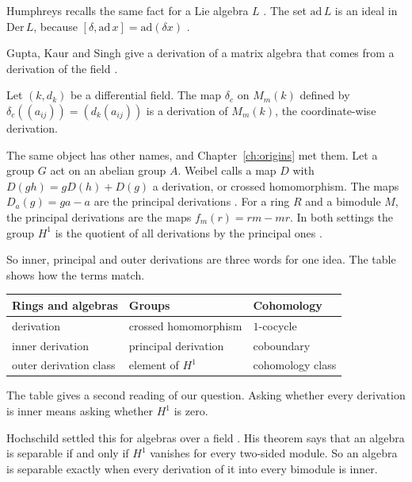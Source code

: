Humphreys recalls the same fact for a Lie algebra $L$
\cite[\S5.3, p.~23]{Humphreys1972}. The set $\mathrm{ad}\,L$ is an ideal in
$\mathrm{Der}\,L$, because $[\delta,\mathrm{ad}\,x]=\mathrm{ad}(\delta x)$
\cite[\S5.3, p.~23]{Humphreys1972}.

Gupta, Kaur and Singh give a derivation of a matrix algebra that comes from a
derivation of the field \cite[Example~1.4]{GuptaKaurSingh2023}.

\begin{example}\label{ex:basic:matrices}
Let $(k,d_k)$ be a differential field. The map $\delta_c$ on $M_m(k)$ defined by
$\delta_c((a_{ij}))=(d_k(a_{ij}))$ is a derivation of $M_m(k)$, the
coordinate-wise derivation.
\end{example}

The same object has other names, and Chapter~\ref{ch:origins} met them. Let a
group $G$ act on an abelian group $A$. Weibel calls a map $D$ with
$D(gh) = gD(h) + D(g)$ a derivation, or crossed homomorphism. The maps
$D_a(g) = ga - a$ are the principal derivations
\cite[Definition~6.4.1, Example~6.4.2]{Weibel1994}. For a ring $R$ and a
bimodule $M$, the principal derivations are the maps $f_m(r) = rm - mr$. In both
settings the group $H^1$ is the quotient of all derivations by the principal
ones \cite[Lemma~9.2.1, p.~301]{Weibel1994}.

So inner, principal and outer derivations are three words for one idea. The
table shows how the terms match.

\begin{center}
\begin{tabular}{lll}
Rings and algebras & Groups & Cohomology \\ \hline
derivation & crossed homomorphism & $1$-cocycle \\
inner derivation & principal derivation & coboundary \\
outer derivation class & element of $H^1$ & cohomology class \\
\end{tabular}
\end{center}

The table gives a second reading of our question. Asking whether every
derivation is inner means asking whether $H^1$ is zero.

Hochschild settled this for algebras over a field
\cite[Theorem~4.1]{Hochschild1945}. His theorem says that an algebra is
separable if and only if $H^1$ vanishes for every two-sided module. So an algebra
is separable exactly when every derivation of it into every bimodule is inner.

